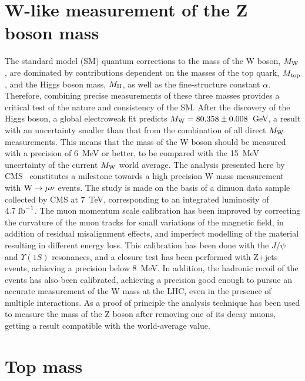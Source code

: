 \documentclass{blois}
\begin{document}
\section{W-like measurement of the Z boson mass}

The standard model (SM) quantum corrections to the mass of the W boson, $M_{\rm W}$,
are dominated by contributions dependent on the masses of the top quark,
$M_{\rm top}$, and the Higgs boson mass, $M_{\rm H}$, as well as the fine-structure
constant $\alpha$. Therefore, combining precise measurements of these three masses
provides a critical test of the nature and consistency of the SM. After the discovery
of the Higgs boson, a global electroweak fit predicts $M_{\rm W} = 80.358 \pm 0.008$~GeV,
a result with an uncertainty smaller than that from the combination of all direct
$M_{\rm W}$ measurements. This means that the mass of the W boson should be
measured with a precision of 6~MeV or better, to be compared with the 15~MeV
uncertainty of the current $M_{\rm W}$ world average. The analysis presented
here by CMS~\cite{ref:CMS-WlikeZmass} constitutes a milestone towards a high
precision W mass measurement with
${\rm W\to\mu\nu}$ events. The study is made on the basis of a dimuon data sample
collected by CMS at 7~TeV, corresponding to an integrated luminosity of
$4.7~{\rm fb}^{-1}$. The muon momentum scale calibration has been improved by
correcting the curvature of the muon tracks for small variations of the magnetic
field, in addition of residual misalignment effects, and imperfect modelling of
the material resulting in different energy loss. This calibration has been done
with the $J/\psi$ and $\Upsilon(1S)$ resonances, and a closure test has been
performed with Z+jets events, achieving a precision below 8~MeV. In addition,
the hadronic recoil of the events has also been calibrated, achieving
a precision good enough to pursue an accurate measurement of the W mass
at the LHC, even in the presence of multiple interactions. As a proof of principle
the analysis technique has been used to measure the mass of the Z boson after
removing one of its decay muons, getting a result compatible with the
world-average value.


\section{Top mass}
\end{document}
